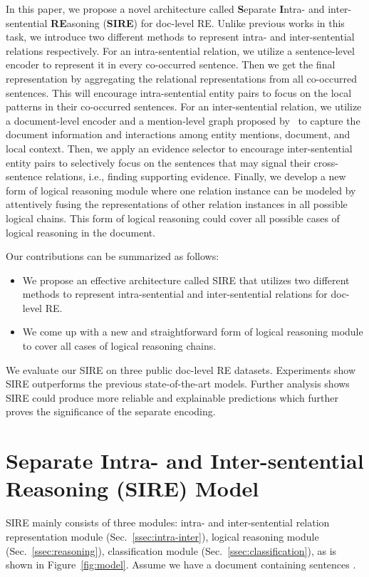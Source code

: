 \documentclass[11pt,a4paper]{article}
\begin{document}
In this paper, we propose a novel architecture called \textbf{S}eparate \textbf{I}ntra- and inter-sentential \textbf{RE}asoning (\textbf{SIRE}) for doc-level RE. Unlike previous works in this task, we introduce two different methods to represent intra- and inter-sentential relations respectively. 
For an intra-sentential relation, we utilize a sentence-level encoder to represent it in every co-occurred sentence. Then we get the final representation by aggregating the relational representations from all co-occurred sentences. This will encourage intra-sentential entity pairs to focus on the local patterns in their co-occurred sentences. 
For an inter-sentential relation, we utilize a document-level encoder and a mention-level graph proposed by~\citet{GAIN} to capture the document information and interactions among entity mentions, document, and local context. Then, we apply an evidence selector to encourage inter-sentential entity pairs to selectively focus on the sentences that may signal their cross-sentence relations, i.e., finding supporting evidence.
Finally, we develop a new form of logical reasoning module where one relation instance can be modeled by attentively fusing the representations of other relation instances in all possible logical chains. This form of logical reasoning could cover all possible cases of logical reasoning in the document.

Our contributions can be summarized as follows:
\begin{itemize}
    \item We propose an effective architecture called SIRE that utilizes two different methods to represent intra-sentential and inter-sentential relations for doc-level RE.
    \item We come up with a new and straightforward form of logical reasoning module to cover all cases of logical reasoning chains.
\end{itemize}

We evaluate our SIRE on three public doc-level RE datasets. Experiments show SIRE outperforms the previous state-of-the-art models. Further analysis shows SIRE could produce more reliable and explainable predictions which further proves the significance of the separate encoding.

 \section{Separate Intra- and Inter-sentential Reasoning (SIRE) Model}

SIRE mainly consists of three modules: intra- and inter-sentential relation representation module (Sec.~\ref{ssec:intra-inter}), logical reasoning module (Sec.~\ref{ssec:reasoning}), classification module (Sec.~\ref{ssec:classification}), as is shown in Figure~\ref{fig:model}. Assume we have a document  containing  sentences . 
\end{document}
